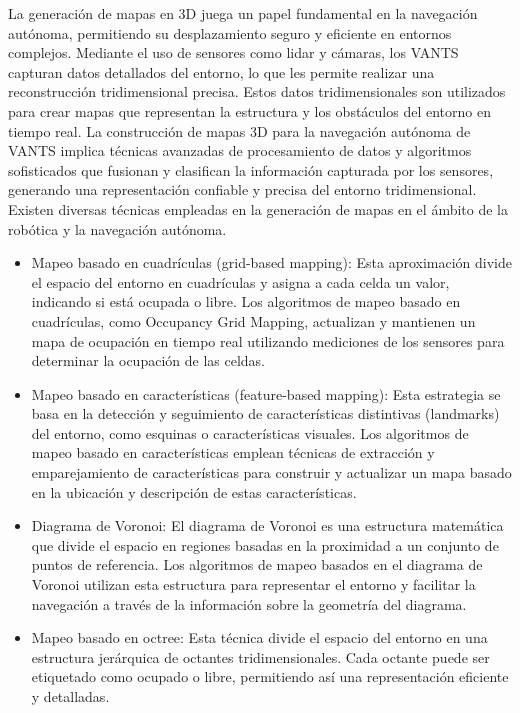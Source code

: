 \documentclass[sigconf]{acmart}
\begin{document}
La generación de mapas en 3D juega un papel fundamental en la navegación autónoma, permitiendo su desplazamiento seguro y eficiente en entornos complejos. Mediante el uso de sensores como lidar y cámaras, los VANTS capturan datos detallados del entorno, lo que les permite realizar una reconstrucción tridimensional precisa. Estos datos tridimensionales son utilizados para crear mapas que representan la estructura y los obstáculos del entorno en tiempo real. La construcción de mapas 3D para la navegación autónoma de VANTS implica técnicas avanzadas de procesamiento de datos y algoritmos sofisticados que fusionan y clasifican la información capturada por los sensores, generando una representación confiable y precisa del entorno tridimensional. Existen diversas técnicas empleadas en la generación de mapas en el ámbito de la robótica y la navegación autónoma.

\begin{itemize}

\item Mapeo basado en cuadrículas (grid-based mapping): Esta aproximación divide el espacio del entorno en cuadrículas y asigna a cada celda un valor, indicando si está ocupada o libre. Los algoritmos de mapeo basado en cuadrículas, como Occupancy Grid Mapping, actualizan y mantienen un mapa de ocupación en tiempo real utilizando mediciones de los sensores para determinar la ocupación de las celdas.

\item Mapeo basado en características (feature-based mapping): Esta estrategia se basa en la detección y seguimiento de características distintivas (landmarks) del entorno, como esquinas o características visuales. Los algoritmos de mapeo basado en características emplean técnicas de extracción y emparejamiento de características para construir y actualizar un mapa basado en la ubicación y descripción de estas características.

\item Diagrama de Voronoi: El diagrama de Voronoi es una estructura matemática que divide el espacio en regiones basadas en la proximidad a un conjunto de puntos de referencia. Los algoritmos de mapeo basados en el diagrama de Voronoi utilizan esta estructura para representar el entorno y facilitar la navegación a través de la información sobre la geometría del diagrama.

\item Mapeo basado en octree: Esta técnica divide el espacio del entorno en una estructura jerárquica de octantes tridimensionales. Cada octante puede ser etiquetado como ocupado o libre, permitiendo así una representación eficiente y detalladas.
\end{itemize}
\end{document}
